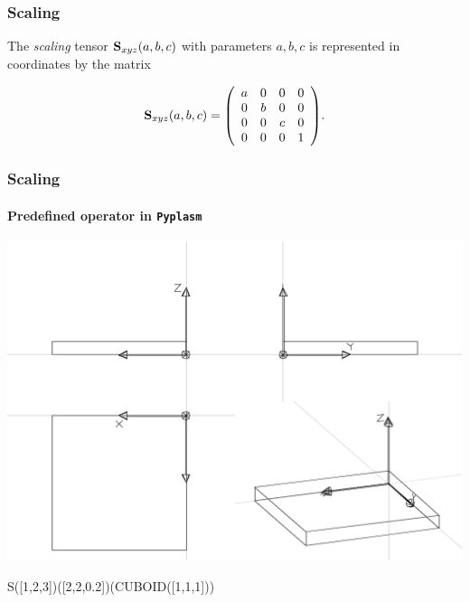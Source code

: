 \documentclass{beamer}
\begin{document}
\begin{frame}\frametitle{Scaling}

\vfill

The  \emph{scaling} tensor ${\bf S}_{xyz}(a,b,c)$ with parameters  $a, b, c$ is represented in coordinates by the matrix
\vfill

\[{\bf S}_{xyz}(a,b,c) =
{\left(\begin{array}{cccccccccccccccccccccccccccc}
a & 0 & 0 & 0\\
0 & b & 0 & 0\\
0 & 0 & c & 0\\
0 & 0 & 0 & 1
\end{array}\right)}.
\]

\vfill
\end{frame}
\begin{frame}[fragile]
\frametitle{Scaling}
\framesubtitle{Predefined operator in \texttt{Pyplasm}}

    
\vfill

\centering\includegraphics[width=0.7\linewidth]{figs/cube-s}


\vfill

\begin{python}
  S([1,2,3])([2,2,0.2])(CUBOID([1,1,1]))
\end{python}


\end{frame}
\end{document}

